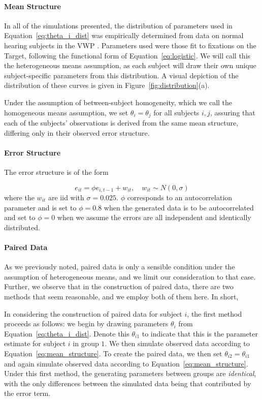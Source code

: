 \documentclass{article}
\begin{document}
\paragraph{Mean Structure} In all of the simulations presented, the distribution of parameters used in Equation~\ref{eq:theta_i_dist} was empirically determined from data on normal hearing subjects in the VWP \citep{FarrisTrimble2014}. Parameters used were those fit to fixations on the Target, following the functional form of Equation~\ref{eq:logistic}. We will call this the heterogeneous means assumption, as each subject will draw their own unique subject-specific parameters from this distribution. A visual depiction of the distribution of these curves is given in Figure~\ref{fig:distribution}(a).

Under the assumption of between-subject homogeneity, which we call the homogeneous means assumption, we set $\theta_i = \theta_j$ for all subjects $i,j$, assuring that each of the subjects' observations is derived from the same mean structure, differing only in their observed error structure. 


\paragraph{Error Structure} The error structure is of the form

\begin{equation}
e_{it} = \phi e_{i, t-1} + w_{it}, \quad w_{it} \sim N(0, \sigma)
\end{equation}
where the $w_{it}$ are iid with $\sigma = 0.025$. $\phi$ corresponds to an autocorrelation parameter and is set to $\phi = 0.8$ when the generated data is to be autocorrelated and set to $\phi = 0$ when we assume the errors are all independent and identically distributed. 

\paragraph{Paired Data} As we previously noted, paired data is only a sensible condition under the assumption of heterogeneous means, and we limit our consideration to that case. Further, we observe that in the construction of paired data, there are two methods that seem reasonable, and we employ both of them here. In short, 


 In considering the construction of paired data for subject $i$, the first method proceeds as follows: we begin by drawing parameters $\theta_i$ from Equation~\ref{eq:theta_i_dist}. Denote this $\theta_{i1}$ to indicate that this is the parameter estimate for subject $i$ in group $1$. We then simulate observed data according to Equation~\ref{eq:mean_structure}. To create the paired data, we then set $\theta_{i2} = \theta_{i1}$ and again simulate observed data according to Equation~\ref{eq:mean_structure}. Under this first method, the generating parameters between groups are \textit{identical}, with the only differences between the simulated data being that contributed by the error term.
\end{document}
